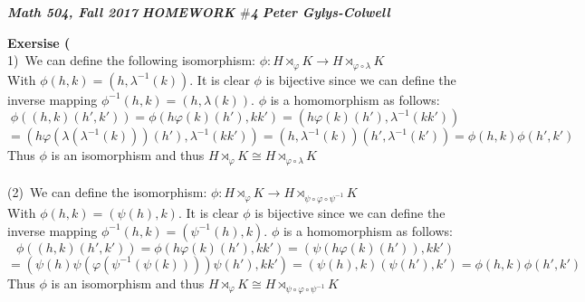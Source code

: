 \documentclass[12pt]{article}
\newenvironment{ques}[1]{\textbf{Exersise #1}\vspace{1 mm}\\ }{\bigskip}
\theoremstyle{definition}
\renewcommand{\l}{\left }
\renewcommand{\r}{\right }
\begin{document}
\noindent \textit{\textbf{Math 504, Fall 2017}} \hspace{1.3cm}
\textit{\textbf{HOMEWORK $\#$4}} \hspace{1.3cm} \textit{\textbf{Peter
Gylys-Colwell}} 

\vspace{1cm}

\begin{ques}{3.1}
	(1)\ We can define the following isomorphism:
	$\phi : H \rtimes_\varphi K \to  H \rtimes_{\varphi \circ \lambda} K$\\
	With $\phi(h,k) = (h, \lambda^{-1}(k))$. It is clear $\phi$ is bijective since
	we can define the inverse mapping $\phi^{-1}(h,k) = (h,\lambda(k))$. $\phi$
	is a homomorphism as follows:
	$$\phi \l( (h, k)(h', k') \r) = \phi (h\varphi(k)(h'), kk') =
	(h\varphi(k)(h'),\lambda^{-1}(kk'))$$
	$$=(h\varphi(\lambda(\lambda^{-1}(k)))(h'),\lambda^{-1}(kk')) = (h,
	\lambda^{-1}(k))(h', \lambda^{-1}(k')) = \phi (h, k) \phi (h', k') $$
	Thus  $\phi$ is an isomorphism and thus $H \rtimes_\varphi K \cong H
	\rtimes_{\varphi \circ \lambda} K$\\
	\\
	(2)\ We can define the isomorphism:
	$\phi : H \rtimes_\varphi K \to  H \rtimes_{\psi \circ \varphi \circ \psi^{-1}} K$\\
	With $\phi(h,k) = (\psi(h), k)$. It is clear $\phi$ is bijective since
	we can define the inverse mapping $\phi^{-1}(h,k) = (\psi^{-1}(h),k)$. $\phi$
	is a homomorphism as follows:
	$$\phi \l( (h, k)(h', k') \r) = \phi (h\varphi(k)(h'), kk') =
	(\psi(h\varphi(k)(h')),kk')$$
	$$=(\psi(h)\psi(\varphi(\psi^{-1}(\psi(k))))\psi(h'),kk') = (\psi(h),
	k)(\psi(h'), k') = \phi (h, k) \phi (h', k') $$
	Thus  $\phi$ is an isomorphism and thus $H \rtimes_\varphi K \cong H
	\rtimes_{\psi \circ \varphi \circ \psi^{-1}} K$\\
\end{ques}
\end{document}
